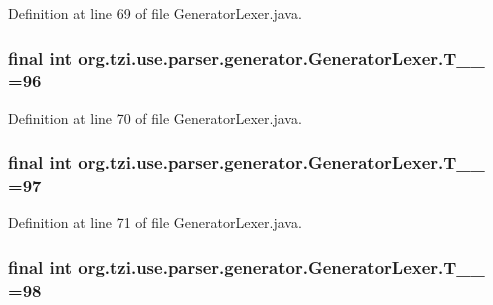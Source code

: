 Definition at line 69 of file Generator\-Lexer.\-java.

\hypertarget{classorg_1_1tzi_1_1use_1_1parser_1_1generator_1_1_generator_lexer_a27b289fc694116757c958c156eb9458f}{
\subsubsection[{T\-\_\-\-\_\-96}]{\setlength{\rightskip}{0pt plus 5cm}final int org.\-tzi.\-use.\-parser.\-generator.\-Generator\-Lexer.\-T\-\_\-\-\_ =96\hspace{0.3cm}{\ttfamily [static]}}}\label{classorg_1_1tzi_1_1use_1_1parser_1_1generator_1_1_generator_lexer_a27b289fc694116757c958c156eb9458f}


Definition at line 70 of file Generator\-Lexer.\-java.

\hypertarget{classorg_1_1tzi_1_1use_1_1parser_1_1generator_1_1_generator_lexer_ac2736b8ff3864ba10853756de5e86943}{
\subsubsection[{T\-\_\-\-\_\-97}]{\setlength{\rightskip}{0pt plus 5cm}final int org.\-tzi.\-use.\-parser.\-generator.\-Generator\-Lexer.\-T\-\_\-\-\_ =97\hspace{0.3cm}{\ttfamily [static]}}}\label{classorg_1_1tzi_1_1use_1_1parser_1_1generator_1_1_generator_lexer_ac2736b8ff3864ba10853756de5e86943}


Definition at line 71 of file Generator\-Lexer.\-java.

\hypertarget{classorg_1_1tzi_1_1use_1_1parser_1_1generator_1_1_generator_lexer_aef6981d486ac183059d81da9b2ce4e39}{
\subsubsection[{T\-\_\-\-\_\-98}]{\setlength{\rightskip}{0pt plus 5cm}final int org.\-tzi.\-use.\-parser.\-generator.\-Generator\-Lexer.\-T\-\_\-\-\_ =98\hspace{0.3cm}{\ttfamily [static]}}}\label{classorg_1_1tzi_1_1use_1_1parser_1_1generator_1_1_generator_lexer_aef6981d486ac183059d81da9b2ce4e39}



